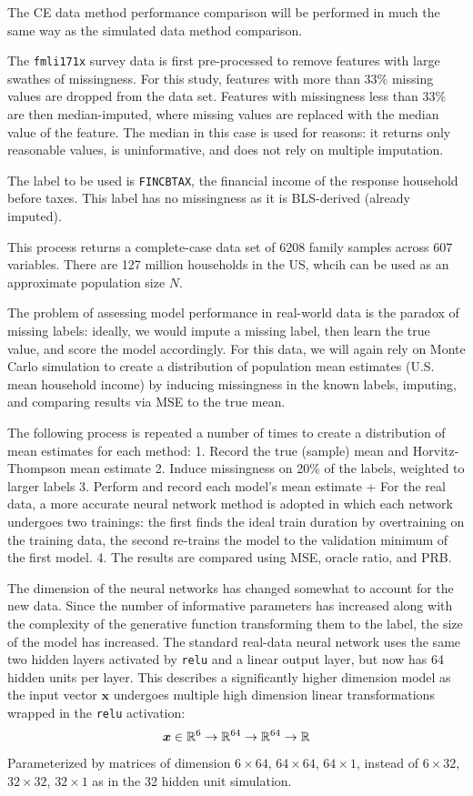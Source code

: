 \documentclass[12pt,twoside]{reedthesis}
\begin{document}
The CE data method performance comparison will be performed in much the
same way as the simulated data method comparison.

The \texttt{fmli171x} survey data is first pre-processed to remove
features with large swathes of missingness. For this study, features
with more than 33\% missing values are dropped from the data set.
Features with missingness less than 33\% are then median-imputed, where
missing values are replaced with the median value of the feature. The
median in this case is used for reasons: it returns only reasonable
values, is uninformative, and does not rely on multiple imputation.

The label to be used is \texttt{FINCBTAX}, the financial income of the
response household before taxes. This label has no missingness as it is
BLS-derived (already imputed).

This process returns a complete-case data set of 6208 family samples
across 607 variables. There are 127 million households in the US, whcih
can be used as an approximate population size \(N\).

The problem of assessing model performance in real-world data is the
paradox of missing labels: ideally, we would impute a missing label,
then learn the true value, and score the model accordingly. For this
data, we will again rely on Monte Carlo simulation to create a
distribution of population mean estimates (U.S. mean household income)
by inducing missingness in the known labels, imputing, and comparing
results via MSE to the true mean.

The following process is repeated a number of times to create a
distribution of mean estimates for each method: 1. Record the true
(sample) mean and Horvitz-Thompson mean estimate 2. Induce missingness
on 20\% of the labels, weighted to larger labels 3. Perform and record
each model's mean estimate + For the real data, a more accurate neural
network method is adopted in which each network undergoes two trainings:
the first finds the ideal train duration by overtraining on the training
data, the second re-trains the model to the validation minimum of the
first model. 4. The results are compared using MSE, oracle ratio, and
PRB.

The dimension of the neural networks has changed somewhat to account for
the new data. Since the number of informative parameters has increased
along with the complexity of the generative function transforming them
to the label, the size of the model has increased. The standard
real-data neural network uses the same two hidden layers activated by
\texttt{relu} and a linear output layer, but now has 64 hidden units per
layer. This describes a significantly higher dimension model as the
input vector \(\boldsymbol{x}\) undergoes multiple high dimension linear
transformations wrapped in the \texttt{relu} activation: \[
\boldsymbol{x} \in \mathbb{R}^6 \\
\rightarrow \mathbb{R}^{64} \\
\rightarrow \mathbb{R}^{64} \rightarrow \mathbb{R}
\] Parameterized by matrices of dimension \(6 \times 64\),
\(64 \times 64\), \(64 \times 1\), instead of \(6 \times 32\),
\(32 \times 32\), \(32 \times 1\) as in the 32 hidden unit simulation.
\end{document}
